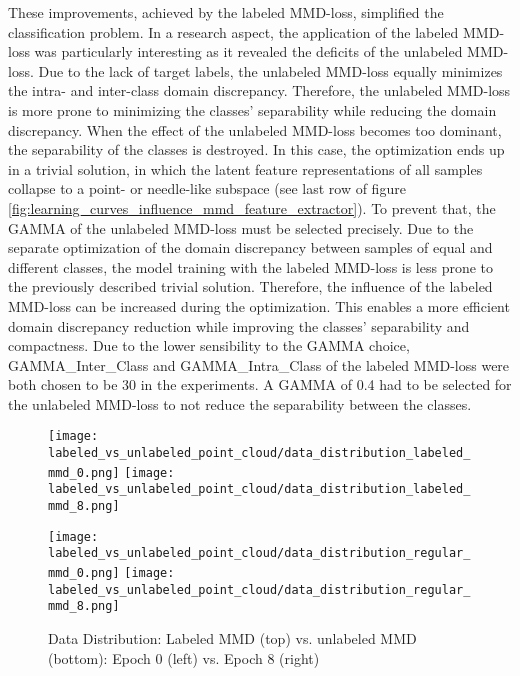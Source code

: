 These improvements, achieved by the labeled MMD-loss, simplified the classification problem. In a  research aspect, the application of the labeled MMD-loss was particularly interesting as it revealed the deficits of the unlabeled MMD-loss. Due to the lack of target labels, the unlabeled MMD-loss equally minimizes the intra- and inter-class domain discrepancy. Therefore, the unlabeled MMD-loss is more prone to minimizing the classes' separability while reducing the domain discrepancy. When the effect of the unlabeled MMD-loss becomes too dominant, the separability of the classes is destroyed. In this case, the optimization ends up in a trivial solution, in which the latent feature representations of all samples collapse to a point- or needle-like subspace (see last row of figure \ref{fig:learning_curves_influence_mmd_feature_extractor}). To prevent that, the GAMMA of the unlabeled MMD-loss must be selected precisely. Due to the separate optimization of the domain discrepancy between samples of equal and different classes, the model training with the labeled MMD-loss is less prone to the previously described trivial solution. Therefore, the influence of the labeled MMD-loss can be increased during the optimization. This enables a more efficient domain discrepancy reduction while improving the classes' separability and compactness. Due to the lower sensibility to the GAMMA choice, GAMMA\_Inter\_Class and GAMMA\_Intra\_Class of the labeled MMD-loss were both chosen to be 30 in the experiments. A GAMMA of 0.4 had to be selected for the unlabeled MMD-loss to not reduce the separability between the classes.


\begin{figure}[htp]
  \centering
  \texttt{[image: labeled\_vs\_unlabeled\_point\_cloud/data\_distribution\_labeled\_mmd\_0.png]}
  \hspace{.4cm}
  \texttt{[image: labeled\_vs\_unlabeled\_point\_cloud/data\_distribution\_labeled\_mmd\_8.png]}

  \vspace{.1cm}

  \texttt{[image: labeled\_vs\_unlabeled\_point\_cloud/data\_distribution\_regular\_mmd\_0.png]}
  \hspace{.4cm}
  \texttt{[image: labeled\_vs\_unlabeled\_point\_cloud/data\_distribution\_regular\_mmd\_8.png]}
  
  \caption{Data Distribution: Labeled MMD (top) vs. unlabeled MMD (bottom): Epoch 0 (left) vs. Epoch 8 (right)}
  \label{fig:point_cloud_labeled_unlabeled_mmd}
\end{figure}

